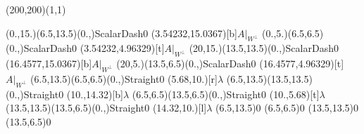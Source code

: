 \unitlength=1bp%

\begin{feynartspicture}(200,200)(1,1)

\FADiagram{}
\FAProp(0.,15.)(6.5,13.5)(0.,){ScalarDash}{0}
\FALabel(3.54232,15.0367)[b]{$A|_{W^\perp}$}
\FAProp(0.,5.)(6.5,6.5)(0.,){ScalarDash}{0}
\FALabel(3.54232,4.96329)[t]{$A|_{W^\perp}$}
\FAProp(20,15.)(13.5,13.5)(0.,){ScalarDash}{0}
\FALabel(16.4577,15.0367)[b]{$A|_{W^\perp}$}
\FAProp(20,5.)(13.5,6.5)(0.,){ScalarDash}{0}
\FALabel(16.4577,4.96329)[t]{$A|_{W^\perp}$}
\FAProp(6.5,13.5)(6.5,6.5)(0.,){Straight}{0}
\FALabel(5.68,10.)[r]{$\lambda$}
\FAProp(6.5,13.5)(13.5,13.5)(0.,){Straight}{0}
\FALabel(10.,14.32)[b]{$\lambda$}
\FAProp(6.5,6.5)(13.5,6.5)(0.,){Straight}{0}
\FALabel(10.,5.68)[t]{$\lambda$}
\FAProp(13.5,13.5)(13.5,6.5)(0.,){Straight}{0}
\FALabel(14.32,10.)[l]{$\lambda$}
\FAVert(6.5,13.5){0}
\FAVert(6.5,6.5){0}
\FAVert(13.5,13.5){0}
\FAVert(13.5,6.5){0}
\end{feynartspicture}


